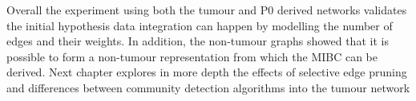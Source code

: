 Overall the experiment using both the tumour and P0 derived networks validates the initial hypothesis data integration can happen by modelling the number of edges and their weights. In addition, the non-tumour graphs showed that it is possible to form a non-tumour representation from which the MIBC can be derived. Next chapter explores in more depth the effects of selective edge pruning and differences between community detection algorithms into the tumour network








